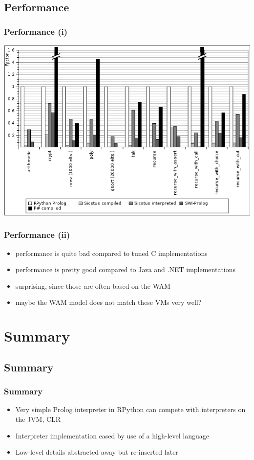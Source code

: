 \documentclass[utf8]{beamer}
\begin{document}
\subsection{Performance}
\begin{frame}
  \frametitle{Performance (i)}
  \includegraphics[scale=0.4]{image/bench.png}
\end{frame}


\begin{frame}
  \frametitle{Performance (ii)}
  \begin{itemize}
  \item
    performance is quite bad compared to tuned C implementations
  \item
    performance is pretty good compared to Java and .NET implementations
  \item
    surprising, since those are often based on the WAM
  \item
    maybe the WAM model does not match these VMs very well?
  \end{itemize}
\end{frame}


\section*{Summary}
\subsection*{Summary}
\begin{frame}
  \frametitle{Summary}

  \begin{itemize}
  \item
    Very simple Prolog interpreter in RPython can compete with interpreters on the JVM, CLR
  \item
    Interpreter implementation eased by use of a high-level language
  \item
    Low-level details abstracted away but re-inserted later
  \end{itemize}
\end{frame}
\end{document}
